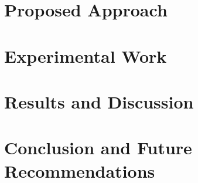\documentclass[letterpaper, 10pt, conference]{ieeeconf}
\begin{document}
\section{Proposed Approach}
\label{sec:ProposedApproach}



\section{Experimental Work}
\label{sec:ExperimentalWork}




\section{Results and Discussion}
\label{sec:ResultsAndDiscussion}




\section{Conclusion and Future Recommendations}
\label{sec:Conclusion}





\end{document}
